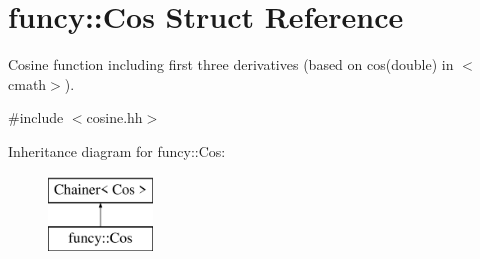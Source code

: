 \hypertarget{structfuncy_1_1Cos}{\section{funcy\-:\-:Cos Struct Reference}
\label{structfuncy_1_1Cos}
}


Cosine function including first three derivatives (based on cos(double) in $<$cmath$>$).  




{\ttfamily \#include $<$cosine.\-hh$>$}

Inheritance diagram for funcy\-:\-:Cos\-:\begin{figure}[H]
\begin{center}
\leavevmode
\includegraphics[height=2.000000cm]{structfuncy_1_1Cos}
\end{center}
\end{figure}
